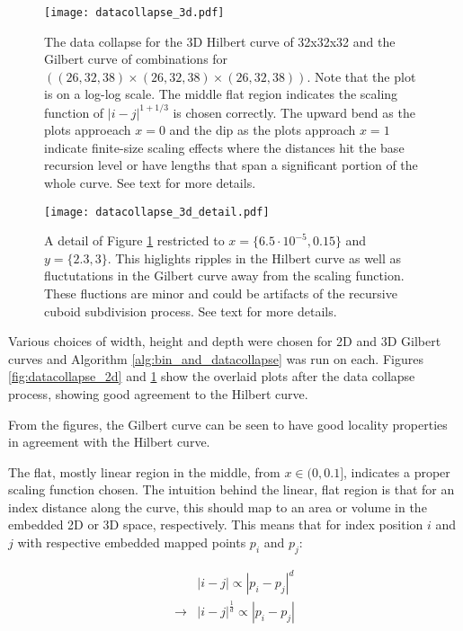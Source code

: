 \begin{figure}[h]
  \centering
  \texttt{[image: datacollapse\_3d.pdf]}
  \caption{ The data collapse for the 3D Hilbert curve of 32x32x32 and the Gilbert curve of combinations for $((26,32,38) \times (26,32,38) \times (26,32,38))$. 
  Note that the plot is on a log-log scale.
  The middle flat region indicates the scaling function of $|i-j|^{1 + 1/3}$ is chosen correctly.
  The upward bend as the plots approeach $x=0$ and the dip as the plots approach $x=1$ indicate finite-size scaling effects where the distances
  hit the base recursion level or have lengths that span a significant portion of the whole curve.
  See text for more details.
  }
  \label{fig:datacollapse_3d}
\end{figure}

\begin{figure}[h]
  \centering
  \texttt{[image: datacollapse\_3d\_detail.pdf]}
  \caption{ A detail of Figure \ref{fig:datacollapse_3d} restricted to $x = \{6.5 \cdot 10^{-5}, 0.15\}$ and $y = \{2.3,3\}$.
  This higlights ripples in the Hilbert curve as well as fluctutations in the Gilbert curve away from the scaling function.
  These fluctions are minor and could be artifacts of the recursive cuboid subdivision process.
  See text for more details.
  }
  \label{fig:datacollapse_3d_detail}
\end{figure}

Various choices of width, height and depth were chosen for 2D and 3D Gilbert curves and
Algorithm \ref{alg:bin_and_datacollapse} was run on each.
Figures \ref{fig:datacollapse_2d} and \ref{fig:datacollapse_3d} show the overlaid plots
after the data collapse process, showing good agreement to the Hilbert curve.

From the figures, the Gilbert curve can be seen to have good locality properties in
agreement with the Hilbert curve.

The flat, mostly linear region in the middle, from $x \in (0, 0.1]$, indicates a proper scaling
function chosen.
The intuition behind the linear, flat region is that for an index distance along the curve,
this should map to an area or volume in the embedded 2D or 3D space, respectively.
This means that for index position $i$ and $j$ with respective embedded mapped points $p_i$ and $p_j$:

$$
\begin{array}{ll}
  & |i-j| \propto |p_i - p_j|^d \\
  \to & |i-j|^{\frac{1}{d}} \propto |p_i - p_j| \\
\end{array}
$$

